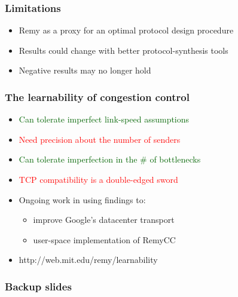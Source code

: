 \documentclass[svgnames]{beamer}
\begin{document}
\begin{Large}






 



\begin{frame}
\frametitle{Limitations}
\begin{itemize}
\item<2-> Remy as a proxy for an optimal protocol design procedure
\item<3-> Results could change with better protocol-synthesis tools
\item<4-> Negative results may no longer hold
\end{itemize}
\end{frame}

\begin{frame}
\frametitle{The learnability of congestion control}
\noindent
\begin{itemize}
\item<2-> \textcolor{darkgreen}{Can tolerate imperfect link-speed assumptions}
\item<3-> \textcolor{red}{Need precision about the number of senders}
\item<4-> \textcolor{darkgreen}{Can tolerate imperfection in the \# of bottlenecks}
\item<5-> \textcolor{red}{TCP compatibility is a double-edged sword}
\item<6-> Ongoing work in using findings to:
\begin{itemize}
\item<2-> improve Google's datacenter transport
\item<3-> user-space implementation of RemyCC
\end{itemize}
\item<7-> http://web.mit.edu/remy/learnability
\end{itemize}
\end{frame}

\end{Large}

\begin{frame}[noframenumbering]
\frametitle{Backup slides}
\end{frame}


\end{document}
